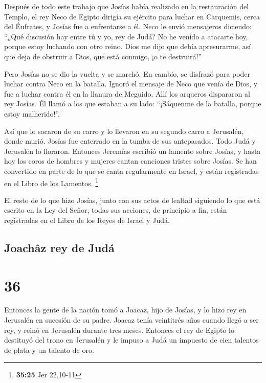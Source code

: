  Después de todo este trabajo que Josías había realizado
en la restauración del Templo, el rey Neco de Egipto dirigía su ejército
para luchar en Carquemis, cerca del Éufrates, y Josías fue a enfrentarse
a él.  Neco le envió mensajeros diciendo: ``¿Qué
discusión hay entre tú y yo, rey de Judá? No he venido a atacarte hoy,
porque estoy luchando con otro reino. Dios me dijo que debía
apresurarme, así que deja de obstruir a Dios, que está conmigo, ¡o te
destruirá!''

 Pero Josías no se dio la vuelta y se marchó. En cambio,
se disfrazó para poder luchar contra Neco en la batalla. Ignoró el
mensaje de Neco que venía de Dios, y fue a luchar contra él en la
llanura de Meguido.  Allí los arqueros dispararon al rey
Josías. Él llamó a los que estaban a su lado: ``¡Sáquenme de la batalla,
porque estoy malherido!''.

 Así que lo sacaron de su carro y lo llevaron en su
segundo carro a Jerusalén, donde murió. Josías fue enterrado en la tumba
de sus antepasados. Todo Judá y Jerusalén lo lloraron. 
Entonces Jeremías escribió un lamento sobre Josías, y hasta hoy los
coros de hombres y mujeres cantan canciones tristes sobre Josías. Se han
convertido en parte de lo que se canta regularmente en Israel, y están
registradas en el Libro de los Lamentos. \footnote{\textbf{35:25} Jer
  22,10-11}

 El resto de lo que hizo Josías, junto con sus actos de
lealtad siguiendo lo que está escrito en la Ley del Señor,
 todas sus acciones, de principio a fin, están
registradas en el Libro de los Reyes de Israel y Judá.

\hypertarget{joachuxe2z-rey-de-juduxe1}{%
\subsection{Joachâz rey de Judá}\label{joachuxe2z-rey-de-juduxe1}}

\hypertarget{section-35}{%
\section{36}\label{section-35}}

 Entonces la gente de la nación tomó a Joacaz, hijo de
Josías, y lo hizo rey en Jerusalén en sucesión de su padre.
 Joacaz tenía veintitrés años cuando llegó a ser rey, y
reinó en Jerusalén durante tres meses.  Entonces el rey de
Egipto lo destituyó del trono en Jerusalén y le impuso a Judá un
impuesto de cien talentos de plata y un talento de oro.


